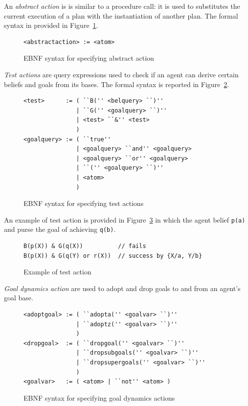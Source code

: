 \documentclass[a4paper]{article}
\begin{document}
An \emph{abstract action} is is similar to a procedure call: it is used to substitutes the current execution of a plan with the instantiation of another plan. The formal syntax in provided in Figure~\ref{fig:ebnf_absaction}.

\begin{figure}[htp]
\begin{verbatim}
<abstractaction> := <atom>
\end{verbatim}
\caption{EBNF syntax for specifying abstract action}
\label{fig:ebnf_absaction}
\end{figure}

\emph{Test actions} are query expressions used to check if an agent can derive certain beliefs and goals from its bases. The formal syntax is reported in Figure~\ref{fig:ebnf_testaction}.

\begin{figure}[htp]
\begin{verbatim}
<test>      := ( ``B('' <belquery> ``)'' 
               | ``G('' <goalquery> ``)''
               | <test> ``&'' <test>
               )
<goalquery> := ( ``true'' 
               | <goalquery> ``and'' <goalquery>
               | <goalquery> ``or'' <goalquery>
               | ``('' <goalquery> ``)''
               | <atom>
               )
\end{verbatim}
\caption{EBNF syntax for specifying test actions}
\label{fig:ebnf_testaction}
\end{figure}

An example of test action is provided in Figure~\ref{fig:example_testaction} in which the agent belief \texttt{p(a)} and purse the goal of achieving \texttt{q(b)}.

\begin{figure}[htp]
\begin{verbatim}
B(p(X)) & G(q(X))          // fails	
B(p(X)) & G(q(Y) or r(X))  // success by {X/a, Y/b}
\end{verbatim}
\caption{Example of test action}
\label{fig:example_testaction}
\end{figure}

\emph{Goal dynamics action} are used to adopt and drop goals to and from an agent's goal base.

\begin{figure}[htp]
\begin{verbatim}
<adoptgoal> := ( ``adopta('' <goalvar> ``)''
               | ``adoptz('' <goalvar> ``)''
               )
<dropgoal>  := ( ``dropgoal('' <goalvar> ``)''
               | ``dropsubgoals('' <goalvar> ``)''
               | ``dropsupergoals('' <goalvar> ``)''
               )
<goalvar>   := ( <atom> | ``not'' <atom> )
\end{verbatim}
\caption{EBNF syntax for specifying goal dynamics actions}
\label{fig:ebnf_goalactions}
\end{figure}
\end{document}
